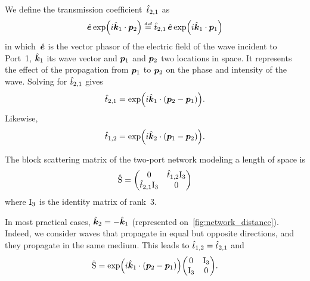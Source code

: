 We define the transmission coefficient~$\hat{t}_{2,1}$ as
\begin{equation}
    \vectcp{e} \exp\left(i \vectcp{k}_1 \cdot \vect{p}_2\right)
    \equaldef
    \cp{t}_{2,1}\,
    \vectcp{e} \exp\left(i \vectcp{k}_1 \cdot \vect{p}_1\right)
\end{equation}
in which~$\hat{\bm{e}}$ is the vector phasor of the electric field of the wave incident to Port~1,
$\hat{\bm{k}}_1$ its wave vector
and $\bm{p}_1$ and $\bm{p}_2$ two locations in space.
It represents the effect of the propagation from $\bm{p}_1$ to $\bm{p}_2$ on the phase and intensity of the wave.
Solving for $\hat{t}_{2,1}$ gives
\begin{equation}
    \cp{t}_{2,1} = \exp\left(i \vectcp{k}_1 \cdot (\vect{p}_2 - \vect{p}_1)\right)
    \text{.}
\end{equation}
Likewise,
\begin{equation}
        \cp{t}_{1,2}
        = \exp\left(i \vectcp{k}_2 \cdot (\vect{p}_1 - \vect{p}_2)\right)
        \text{.}
\end{equation}

The block scattering matrix of the two-port network modeling a length of space is
\begin{equation}
    \hat{\mathrm{S}}
    =
    \begin{pmatrix}
        0                       & \hat{t}_{1,2} \mathrm{I}_3 \\
        \hat{t}_{2,1} \mathrm{I}_3 & 0                       \\
    \end{pmatrix}
\end{equation}
where $\mathrm{I}_3$ is the identity matrix of rank~3.

In most practical cases, $\hat{\bm{k}}_2=-\hat{\bm{k}}_1$ (represented on~\cref{fig:network_distance}).
Indeed, we consider waves that propagate in equal but opposite directions, and they propagate in the same medium.
This leads to $\hat{t}_{1,2}=\hat{t}_{2,1}$ and
\begin{equation}
    \matrcp{S}
    =
    \exp\left(i \vectcp{k}_1 \cdot (\vect{p}_2 - \vect{p}_1)\right)
    \begin{pmatrix}
        0                       & \matr{I}_3 \\
        \matr{I}_3 & 0                       \\
    \end{pmatrix}
    \text{.}
\end{equation}



